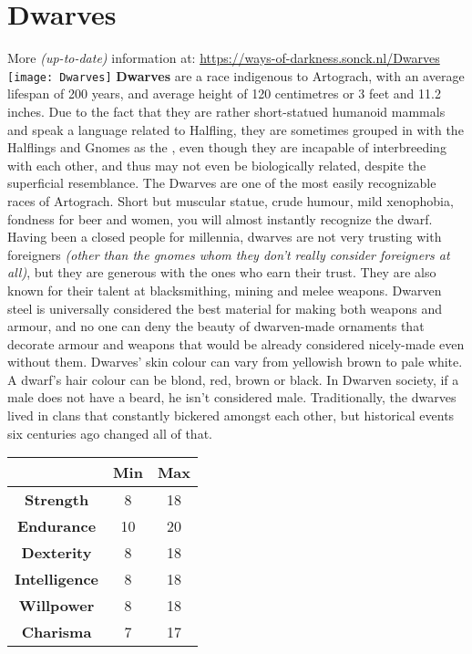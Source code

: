 \documentclass[openany,10pt,a4paper]{book}
\begin{document}
\section{Dwarves}
More \textit{(up-to-date)} information at: \url{https://ways-of-darkness.sonck.nl/Dwarves}\newline
\texttt{[image: Dwarves]}\newline
\textbf{Dwarves} are a race indigenous to Artograch, with an average lifespan of 200 years, and average height of 120 centimetres or 3 feet and 11.2 inches. Due to the fact that they are rather short-statued humanoid mammals and speak a language related to Halfling, they are sometimes grouped in with the Halflings and Gnomes as the , even though they are incapable of interbreeding with each other, and thus may not even be biologically related, despite the superficial resemblance.\newline
The Dwarves are one of the most easily recognizable races of Artograch. Short but muscular statue, crude humour, mild xenophobia, fondness for beer and women, you will almost instantly recognize the dwarf. Having been a closed people for millennia, dwarves are not very trusting with foreigners \textit{(other than the gnomes whom they don’t really consider foreigners at all)}, but they are generous with the ones who earn their trust. They are also known for their talent at blacksmithing, mining and melee weapons. Dwarven steel is universally considered the best material for making both weapons and armour, and no one can deny the beauty of dwarven-made ornaments that decorate armour and weapons that would be already considered nicely-made even without them. Dwarves’ skin colour can vary from yellowish brown to pale white. A dwarf's hair colour can be blond, red, brown or black. In Dwarven society, if a male does not have a beard, he isn't considered male. Traditionally, the dwarves lived in clans that constantly bickered amongst each other, but historical events six centuries ago changed all of that.\newline
\begin{tabular}{|c|c|c|}
\hline
 & \textbf{Min} & \textbf{Max} \\ \hline
\textbf{Strength} & 8 & 18 \\ \hline
\textbf{Endurance} & 10 & 20 \\ \hline
\textbf{Dexterity} & 8 & 18 \\ \hline
\textbf{Intelligence} & 8 & 18 \\ \hline
\textbf{Willpower} & 8 & 18 \\ \hline
\textbf{Charisma} & 7 & 17 \\ \hline
\end{tabular}\newline
{} \newpage
\end{document}
